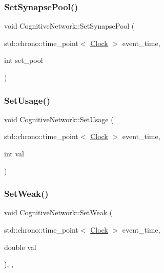 \subsubsection{\texorpdfstring{Set\+Synapse\+Pool()}{SetSynapsePool()}}
{\footnotesize\ttfamily void Cognitive\+Network\+::\+Set\+Synapse\+Pool (\begin{DoxyParamCaption}\item[{std\+::chrono\+::time\+\_\+point$<$ \mbox{\hyperlink{universe_8h_a0ef8d951d1ca5ab3cfaf7ab4c7a6fd80}{Clock}} $>$}]{event\+\_\+time,  }\item[{int}]{set\+\_\+pool }\end{DoxyParamCaption})\hspace{0.3cm}{\ttfamily [inline]}}

\mbox{\label{classCognitiveNetwork_a8b6b4afc47df279604be13bce77f5b0a}} 
\subsubsection{\texorpdfstring{Set\+Usage()}{SetUsage()}}
{\footnotesize\ttfamily void Cognitive\+Network\+::\+Set\+Usage (\begin{DoxyParamCaption}\item[{std\+::chrono\+::time\+\_\+point$<$ \mbox{\hyperlink{universe_8h_a0ef8d951d1ca5ab3cfaf7ab4c7a6fd80}{Clock}} $>$}]{event\+\_\+time,  }\item[{int}]{val }\end{DoxyParamCaption})\hspace{0.3cm}{\ttfamily [inline]}}

\mbox{\label{classCognitiveNetwork_ab39c9eed50da6d3630c4498ae64b804e}} 
\subsubsection{\texorpdfstring{Set\+Weak()}{SetWeak()}}
{\footnotesize\ttfamily void Cognitive\+Network\+::\+Set\+Weak (\begin{DoxyParamCaption}\item[{std\+::chrono\+::time\+\_\+point$<$ \mbox{\hyperlink{universe_8h_a0ef8d951d1ca5ab3cfaf7ab4c7a6fd80}{Clock}} $>$}]{event\+\_\+time,  }\item[{double}]{val }\end{DoxyParamCaption})\hspace{0.3cm}{\ttfamily [inline]}, {\ttfamily [final]}, {\ttfamily [virtual]}}




